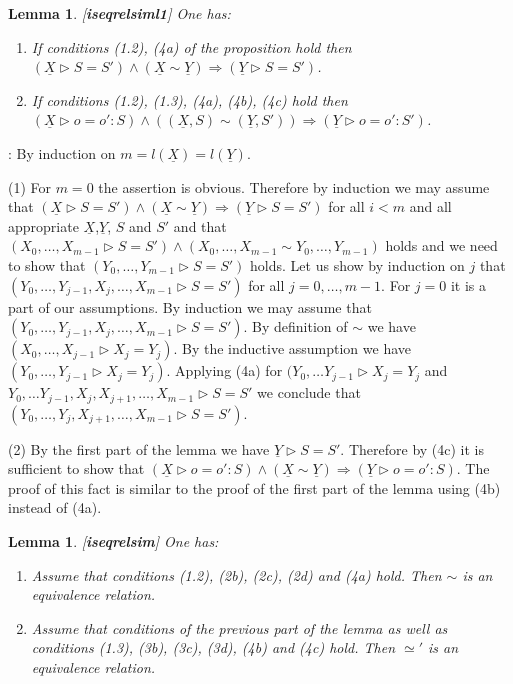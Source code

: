 \documentclass[11pt]{article}
\newenvironment{proof}{{\bf Proof}:}{\vskip 5mm }
\newtheorem{lemma}[proposition]{Lemma}
\newcommand{\llabel}[1]{\label{#1}[{\bf #1}]}
\newcommand{\uu}{\underline}
\newcommand{\impl}{{\Rightarrow}}
\begin{document}
\begin{lemma}
\llabel{iseqrelsiml1}
One has:
%
\begin{enumerate}
\item If conditions (1.2), (4a) of the proposition hold then $(\uu{X}\rhd S=S')\wedge(\uu{X}\sim\uu{Y})\impl (\uu{Y}\rhd S=S')$.
\item If conditions (1.2), (1.3), (4a), (4b), (4c) hold then $(\uu{X}\rhd o=o':S)\wedge((\uu{X},S)\sim(\uu{Y},S'))\impl (\uu{Y}\rhd o=o':S')$.
\end{enumerate}
\end{lemma}
%
\begin{proof}
By induction on $m=l(\uu{X})=l(\uu{Y})$.

(1) For $m=0$ the assertion is obvious. Therefore by induction we may assume that $(\uu{X}\rhd S=S')\wedge(\uu{X}\sim\uu{Y})\impl (\uu{Y}\rhd S=S')$ for all $i<m$ and all appropriate $\uu{X}$,$\uu{Y}$, $S$ and $S'$ and that $(X_0,\dots,X_{m-1}\rhd S=S')\wedge(X_0,\dots,X_{m-1}\sim Y_0,\dots,Y_{m-1})$ holds and we need to show that $(Y_0,\dots,Y_{m-1}\rhd S=S')$ holds. Let us show by induction on $j$ that $(Y_0,\dots,Y_{j-1},X_{j},\dots,X_{m-1}\rhd S=S')$ for all $j=0,\dots,m-1$. For $j=0$ it is a part of our assumptions. By induction we may assume that $(Y_0,\dots,Y_{j-1},X_{j},\dots,X_{m-1}\rhd S=S')$. By definition of $\sim$ we have $(X_0,\dots,X_{j-1}\rhd X_{j}=Y_{j})$. By the inductive assumption we have $(Y_0,\dots,Y_{j-1}\rhd X_{j}=Y_{j})$. Applying (4a) for $(Y_0,\dots Y_{j-1}\rhd X_{j}=Y_{j}$ and $Y_0,\dots Y_{j-1}, X_{j}, X_{j+1},\dots, X_{m-1}\rhd S=S'$ we conclude that $(Y_0,\dots,Y_{j},X_{j+1},\dots,X_{m-1}\rhd S=S')$.

(2) By the first part of the lemma we have $\uu{Y}\rhd S=S'$. Therefore by (4c) it is sufficient to show that $(\uu{X}\rhd o=o':S)\wedge(\uu{X}\sim\uu{Y})\impl (\uu{Y}\rhd o=o':S)$. The proof of this fact is similar to the proof of the first part of the lemma using (4b) instead of (4a).  
\end{proof}
%
\begin{lemma}
\llabel{iseqrelsim}
One has:
%
\begin{enumerate}
\item Assume that conditions (1.2), (2b), (2c), (2d) and (4a) hold. Then $\sim$ is an equivalence relation.
\item Assume that conditions of the previous part of the lemma as well as conditions (1.3), (3b), (3c), (3d), (4b) and (4c) hold. Then $\simeq'$ is an equivalence relation. 
\end{enumerate}
\end{lemma}
\end{document}
